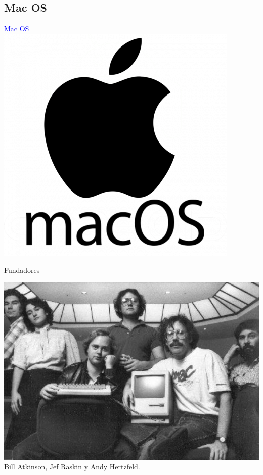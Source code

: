 \documentclass[10pt,xcolor={dvipsnames}]{beamer}
\begin{document}
\subsection{Mac OS}
\begin{frame}
\begin{center}
\Huge{\textcolor{blue}{Mac OS}} \\ \vspace{0.5cm}
\includegraphics[scale=0.35]{Figures/MCOs}
\end{center}
\end{frame}

\begin{frame}{Fundadores}
\begin{center}
\includegraphics[scale=0.5]{Figures/apple-macintosh} \\
Bill Atkinson, Jef Raskin y Andy Hertzfeld.
\end{center}
\end{frame}
\end{document}
